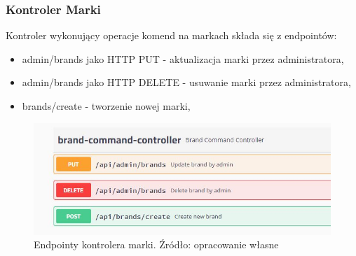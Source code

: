 \subsubsection{Kontroler Marki}
Kontroler wykonujący operacje komend na markach składa się z endpointów:
\begin{itemize}
    \item admin/brands jako HTTP PUT - aktualizacja marki przez administratora,
    \item admin/brands jako HTTP DELETE - usuwanie marki przez administratora,
    \item brands/create - tworzenie nowej marki,
\end{itemize}
\begin{figure}[h!]
  \centering
    \includegraphics[width=1.0\textwidth]{images/brandContrApiCommand.JPG}
  \caption{Endpointy kontrolera marki. Źródło: opracowanie własne }
\end{figure}
\FloatBarrier
